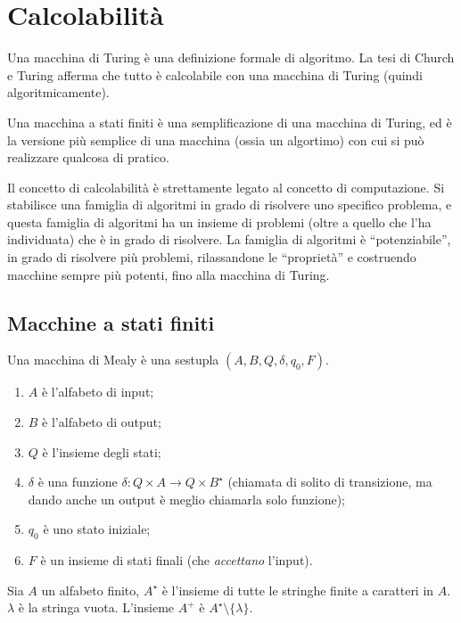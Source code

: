 \chapter{Calcolabilit\`a}

Una macchina di Turing \`e una definizione formale di algoritmo. La tesi di Church e Turing afferma che tutto \`e calcolabile con una macchina di Turing (quindi algoritmicamente).

Una macchina a stati finiti \`e una semplificazione di una macchina di Turing, ed \`e la versione pi\`u semplice di una macchina (ossia un algortimo) con cui si pu\`o realizzare qualcosa di pratico.

Il concetto di calcolabilit\`a \`e strettamente legato al concetto di computazione. Si stabilisce una famiglia di algoritmi in grado di risolvere uno specifico problema, e questa famiglia di algoritmi ha un insieme di problemi (oltre a quello che l'ha individuata) che \`e in grado di risolvere. La famiglia di algoritmi \`e ``potenziabile'', in grado di risolvere pi\`u problemi, rilassandone le ``propriet\`a'' e costruendo macchine sempre pi\`u potenti, fino alla macchina di Turing.

\section{Macchine a stati finiti}

\begin{defn}
Una macchina di Mealy \`e una sestupla $(A, B, Q, \delta, q_0, F)$.
\begin{enumerate}
    \item $A$ \`e l'alfabeto di input;
    \item $B$ \`e l'alfabeto di output;
    \item $Q$ \`e l'insieme degli stati;
    \item $\delta$ \`e una funzione $\delta : Q \times A \to Q \times B^{\star}$ (chiamata di solito di transizione, ma dando anche un output \`e meglio chiamarla solo funzione);
    \item $q_0$ \`e uno stato iniziale;
    \item $F$ \`e un insieme di stati finali (che \emph{accettano} l'input).
\end{enumerate}
\end{defn}
Sia $A$ un alfabeto finito, $A^{\star}$ \`e l'insieme di tutte le stringhe finite a caratteri in $A$. $\lambda$ \`e la stringa vuota. L'insieme $A^{+}$ \`e $A^{\star} \setminus \{ \lambda \}$.


